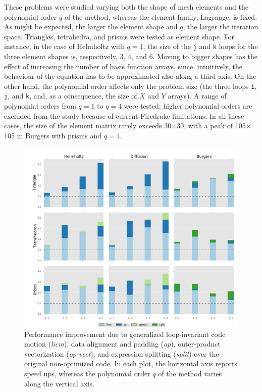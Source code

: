 These problems were studied varying both the shape of mesh elements and the polynomial order $q$ of the method, whereas the element family, Lagrange, is fixed. As might be expected, the larger the element shape and $q$, the larger the iteration space. Triangles, tetrahedra, and prisms were tested as element shape. For instance, in the case of Helmholtz with $q=1$, the size of the \texttt{j} and \texttt{k} loops for the three element shapes is, respectively, $3$, $4$, and $6$. Moving to bigger shapes has the effect of increasing the number of basis function arrays, since, intuitively, the behaviour of the equation has to be approximated also along a third axis. On the other hand, the polynomial order affects only the problem size (the three loops \texttt{i}, \texttt{j}, and \texttt{k}, and, as a consequence, the size of $X$ and $Y$ arrays). A range of polynomial orders from $q=1$ to $q=4$ were tested; higher polynomial orders are excluded from the study because of current Firedrake limitations. In all these cases, the size of the element matrix rarely exceeds 30$\times$30, with a peak of 105$\times$105 in Burgers with prisms and $q=4$.

\begin{figure}[t]
\centerline{\includegraphics[scale=0.45]{coffee/perf-results/individual/graph}}
\caption{Performance improvement due to generalized loop-invariant code motion (\emph{licm}), data alignment and padding (\emph{ap}), outer-product vectorization (\emph{op-vect}), and expression splitting (\emph{split}) over the original non-optimized code. In each plot, the horizontal axis reports speed ups, whereas the polynomial order $q$ of the method varies along the vertical axis.}
\label{fig:coffee-individual-res}
\end{figure}

